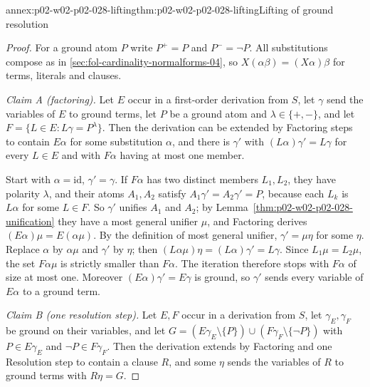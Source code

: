 \begin{annexitem}{annex:p02-w02-p02-028-lifting}{thm:p02-w02-p02-028-lifting}{Lifting of ground resolution}
\begin{proof}
For a ground atom \(P\) write \(P^+=P\) and \(P^-=\neg P\).  All
substitutions compose as in \cref{sec:fol-cardinality-normalforms-04}, so
\(X(\alpha\beta)=(X\alpha)\beta\) for terms, literals and clauses.

\emph{Claim A (factoring).}  Let \(E\) occur in a first-order derivation from
\(S\), let \(\gamma\) send the variables of \(E\) to ground terms, let \(P\)
be a ground atom and \(\lambda\in\{+,-\}\), and let
\(F=\{L\in E:L\gamma=P^\lambda\}\).  Then the derivation can be extended by
Factoring steps to contain \(E\alpha\) for some substitution \(\alpha\), and
there is \(\gamma'\) with \((L\alpha)\gamma'=L\gamma\) for every \(L\in E\)
and with \(F\alpha\) having at most one member.

Start with \(\alpha=\mathrm{id}\), \(\gamma'=\gamma\).  If \(F\alpha\) has two
distinct members \(L_1,L_2\), they have polarity \(\lambda\), and their atoms
\(A_1,A_2\) satisfy \(A_1\gamma'=A_2\gamma'=P\), because each \(L_k\) is
\(L\alpha\) for some \(L\in F\).  So \(\gamma'\) unifies \(A_1\) and
\(A_2\); by Lemma~\ref{thm:p02-w02-p02-028-unification} they have a most
general unifier
\(\mu\), and Factoring derives \((E\alpha)\mu=E(\alpha\mu)\).  By the
definition of most general unifier, \(\gamma'=\mu\eta\) for some \(\eta\).
Replace \(\alpha\) by \(\alpha\mu\) and \(\gamma'\) by \(\eta\); then
\((L\alpha\mu)\eta=(L\alpha)\gamma'=L\gamma\).  Since \(L_1\mu=L_2\mu\), the
set \(F\alpha\mu\) is strictly smaller than \(F\alpha\).  The iteration
therefore stops with \(F\alpha\) of size at most one.  Moreover
\((E\alpha)\gamma'=E\gamma\) is ground, so \(\gamma'\) sends every variable
of \(E\alpha\) to a ground term.

\emph{Claim B (one resolution step).}  Let \(E,F\) occur in a derivation from
\(S\), let \(\gamma_E,\gamma_F\) be ground on their variables, and let
\(G=(E\gamma_E\setminus\{P\})\cup(F\gamma_F\setminus\{\neg P\})\) with
\(P\in E\gamma_E\) and \(\neg P\in F\gamma_F\).  Then the derivation extends
by Factoring and one Resolution step to contain a clause \(R\), and some
\(\eta\) sends the variables of \(R\) to ground terms with \(R\eta=G\).


\end{proof}
\end{annexitem}
